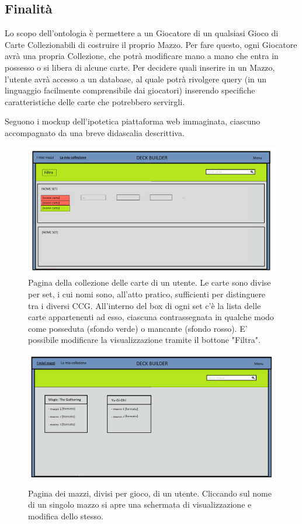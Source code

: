 \documentclass[12pt]{article}
\begin{document}
\subsection{Finalità}
Lo scopo dell’ontologia è permettere a un Giocatore di un qualsiasi Gioco di Carte Collezionabili di costruire il proprio Mazzo. Per fare questo, ogni Giocatore avrà una propria Collezione, che potrà modificare mano a mano che entra in possesso o si libera di alcune carte. Per decidere quali inserire in un Mazzo, l'utente avrà accesso a un database, al quale potrà rivolgere query (in un linguaggio facilmente comprensibile dai giocatori) inserendo specifiche caratteristiche delle carte che potrebbero servirgli.

Seguono i mockup dell'ipotetica piattaforma web immaginata, ciascuno accompagnato da una breve didascalia descrittiva.

\begin{figure}[H]
    \centering
         \includegraphics[width=13cm]{files/mockup_collezione.png}
    \caption{Pagina della collezione delle carte di un utente. Le carte sono divise per set, i cui nomi sono, all'atto pratico, sufficienti per distinguere tra i diversi CCG. All'interno del box di ogni set c'è la lista delle carte appartenenti ad esso, ciascuna contrassegnata in qualche modo come posseduta (sfondo verde) o mancante (sfondo rosso). E' possibile modificare la visualizzazione tramite il bottone "Filtra".}
    \label{fig:mockup_collezione}
\end{figure}
\begin{figure}[H]
    \centering
         \includegraphics[width=13cm]{files/mockup_mazzi.png}
    \caption{Pagina dei mazzi, divisi per gioco, di un utente. Cliccando sul nome di un singolo mazzo si apre una schermata di visualizzazione e modifica dello stesso.}
    \label{fig:mockup_mazzi}
\end{figure}
\end{document}
